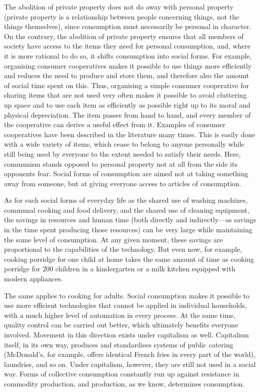 \documentclass[../main]{subfiles}
\begin{document}
The abolition of private property does not do away with personal property (private property is a relationship between people concerning things, not the things themselves), since consumption must necessarily be personal in character. On the contrary, the abolition of private property ensures that all members of society have access to the items they need for personal consumption, and, where it is more rational to do so, it shifts consumption into social forms. For example, organising consumer cooperatives makes it possible to use things more efficiently and reduces the need to produce and store them, and therefore also the amount of social time spent on this. Thus, organising a simple consumer cooperative for sharing items that are not used very often makes it possible to avoid cluttering up space and to use each item as efficiently as possible right up to its moral and physical depreciation. The item passes from hand to hand, and every member of the cooperative can derive a useful effect from it. Examples of consumer cooperatives have been described in the literature many times. This is easily done with a wide variety of items, which cease to belong to anyone personally while still being used by everyone to the extent needed to satisfy their needs. Here, communism stands opposed to personal property not at all from the side its opponents fear. Social forms of consumption are aimed not at taking something away from someone, but at giving everyone access to articles of consumption.

As for such social forms of everyday life as the shared use of washing machines, communal cooking and food delivery, and the shared use of cleaning equipment, the savings in resources and human time (both directly and indirectly—as savings in the time spent producing those resources) can be very large while maintaining the same level of consumption. At any given moment, these savings are proportional to the capabilities of the technology. But even now, for example, cooking porridge for one child at home takes the same amount of time as cooking porridge for 200 children in a kindergarten or a milk kitchen equipped with modern appliances.

The same applies to cooking for adults. Social consumption makes it possible to use more efficient technologies that cannot be applied in individual households, with a much higher level of automation in every process. At the same time, quality control can be carried out better, which ultimately benefits everyone involved. Movement in this direction exists under capitalism as well. Capitalism itself, in its own way, produces and standardises systems of public catering (McDonald's, for example, offers identical French fries in every part of the world), laundries, and so on. Under capitalism, however, they are still not used in a social way. Forms of collective consumption constantly run up against resistance in commodity production, and production, as we know, determines consumption.
\end{document}
